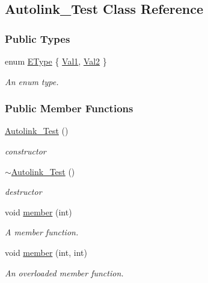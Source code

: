 \hypertarget{class_autolink___test}{}\subsection{Autolink\+\_\+\+Test Class Reference}
\label{class_autolink___test}
\subsubsection*{Public Types}
\begin{DoxyCompactItemize}
\item 
enum \hyperlink{class_autolink___test_aeb611627c332d067bded1806b1bb45c2}{E\+Type} \{ \hyperlink{class_autolink___test_aeb611627c332d067bded1806b1bb45c2af70631e295bce280e74762d18af47a94}{Val1}, 
\hyperlink{class_autolink___test_aeb611627c332d067bded1806b1bb45c2a7d760f44a8971559d108a609b8fb9b3b}{Val2}
 \}\begin{DoxyCompactList}\small\item\em An enum type. \end{DoxyCompactList}
\end{DoxyCompactItemize}
\subsubsection*{Public Member Functions}
\begin{DoxyCompactItemize}
\item 
\hyperlink{class_autolink___test_a278d631f9943428c05b17d78f14488e2}{Autolink\+\_\+\+Test} ()
\begin{DoxyCompactList}\small\item\em constructor \end{DoxyCompactList}\item 
\hyperlink{class_autolink___test_a03bf46c8e2b733680035f524fd7b193b}{$\sim$\+Autolink\+\_\+\+Test} ()
\begin{DoxyCompactList}\small\item\em destructor \end{DoxyCompactList}\item 
void \hyperlink{class_autolink___test_a393ea281f235a2f603d98daf72b0d411}{member} (int)
\begin{DoxyCompactList}\small\item\em A member function. \end{DoxyCompactList}\item 
void \hyperlink{class_autolink___test_acf783a43c2b4b6cc9dd2361784eca2e1}{member} (int, int)
\begin{DoxyCompactList}\small\item\em An overloaded member function. \end{DoxyCompactList}\end{DoxyCompactItemize}
